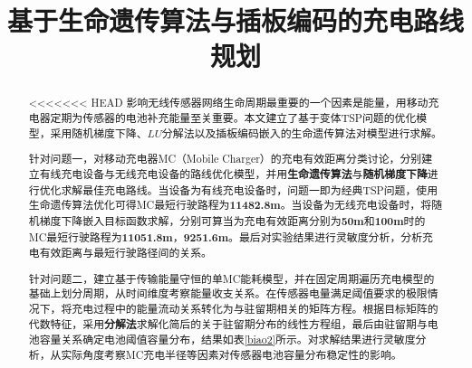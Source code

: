 \documentclass{whutmod}
\title{基于生命遗传算法与插板编码的充电路线规划}
\begin{document}
	\maketitle
	\thispagestyle{empty}
	\begin{abstract}
<<<<<<< HEAD
	    影响无线传感器网络生命周期最重要的一个因素是能量，用移动充电器定期为传感器的电池补充能量至关重要。本文建立了基于变体TSP问题的优化模型，采用随机梯度下降、$LU$分解法以及插板编码嵌入的生命遗传算法对模型进行求解。
	
		针对问题一，对移动充电器MC（Mobile Charger）的充电有效距离分类讨论，分别建立有线充电设备与无线充电设备的路线优化模型，并用\textbf{生命遗传算法}与\textbf{随机梯度下降}进行优化求解最佳充电路线。当设备为有线充电设备时，问题一即为经典TSP问题，使用生命遗传算法优化可得MC最短行驶路程为\textbf{11482.8m}。当设备为无线充电设备时，将随机梯度下降嵌入目标函数求解，分别可算当为充电有效距离分别为\textbf{50m}和\textbf{100m}时的MC最短行驶路程为\textbf{11051.8m}，\textbf{9251.6m}。最后对实验结果进行灵敏度分析，分析充电有效距离与最短行驶路径间的关系。
		
		
		针对问题二，建立基于传输能量守恒的单MC能耗模型，并在固定周期遍历充电模型的基础上划分周期，从时间维度考察能量收支关系。在传感器电量满足阈值要求的极限情况下，将充电过程中的能量流动关系转化为与驻留期相关的矩阵方程。根据目标矩阵的代数特征，采用\textbf{分解法}求解化简后的关于驻留期分布的线性方程组，最后由驻留期与电池容量关系确定电池阈值容量分布，结果如表\ref{biao2}所示。对求解结果进行灵敏度分析，从实际角度考察MC充电半径等因素对传感器电池容量分布稳定性的影响。
		

\end{abstract}
\end{document}

